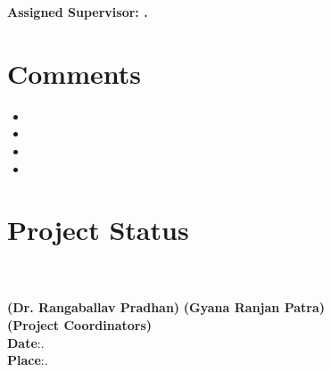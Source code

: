 \documentclass[12pt,a4paper]{article}
\begin{document}
\vspace{1.5cm}
\noindent \textbf{Assigned Supervisor: \hrulefill. \hfill} \\

\section*{Comments}
\begin{itemize}
    \item 
    \item 
    \item 
    \item 
\end{itemize}

\section*{Project Status}
 \hfill {} \\

\vspace{1.5cm}
\noindent\hrulefill \hfill \hrulefill\\
\noindent \textbf{(Dr. Rangaballav Pradhan)} \hfill \textbf{(Gyana Ranjan Patra)} \\
\centering \textbf{(Project Coordinators)}\\[2em]

\textbf{Date}:\hrulefill\hfill .\\[2em]
\textbf{Place}:\hrulefill\hfill .\\
\end{document}

